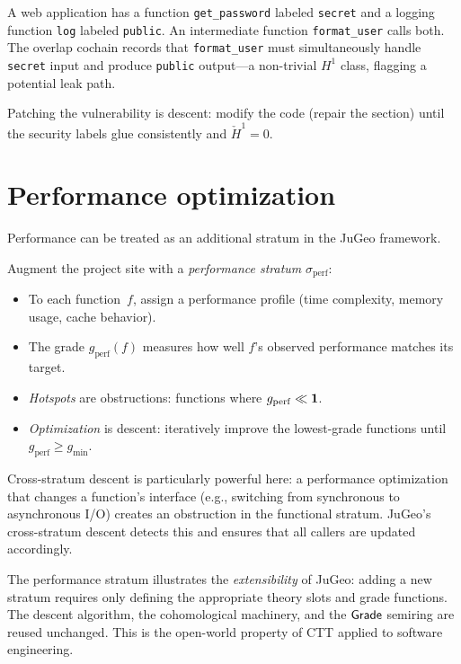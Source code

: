 \begin{example}
A web application has a function \texttt{get\_password} labeled
\texttt{secret} and a logging function \texttt{log} labeled
\texttt{public}.  An intermediate function \texttt{format\_user}
calls both.  The overlap cochain records that \texttt{format\_user}
must simultaneously handle \texttt{secret} input and produce
\texttt{public} output---a non-trivial $H^1$ class, flagging a
potential leak path.
\end{example}

Patching the vulnerability is descent: modify the code (repair the
section) until the security labels glue consistently and
$\check{H}^1 = 0$.

\section{Performance optimization}
\label{sec:perf-opt}

Performance can be treated as an additional stratum in the JuGeo
framework.

\begin{construction}
\label{con:perf-stratum}
Augment the project site with a \emph{performance stratum}
$\sigma_{\mathrm{perf}}$:
\begin{itemize}
  \item To each function~$f$, assign a performance profile
        (time complexity, memory usage, cache behavior).
  \item The grade $g_{\mathrm{perf}}(f)$ measures how well $f$'s
        observed performance matches its target.
  \item \emph{Hotspots} are obstructions: functions where
        $g_{\mathrm{perf}} \ll \mathbf{1}$.
  \item \emph{Optimization} is descent: iteratively improve the
        lowest-grade functions until
        $g_{\mathrm{perf}} \geq g_{\min}$.
\end{itemize}
\end{construction}

Cross-stratum descent is particularly powerful here: a performance
optimization that changes a function's interface (e.g., switching
from synchronous to asynchronous I/O) creates an obstruction in
the functional stratum.  JuGeo's cross-stratum descent detects this
and ensures that all callers are updated accordingly.

\begin{remark}
The performance stratum illustrates the \emph{extensibility} of
JuGeo: adding a new stratum requires only defining the appropriate
theory slots and grade functions.  The descent algorithm, the
cohomological machinery, and the $\mathsf{Grade}$ semiring are reused
unchanged.  This is the open-world property of CTT applied to
software engineering.
\end{remark}

